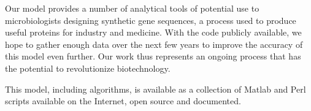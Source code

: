 \documentclass[12pt]{article}
\numberwithin{equation}{section}
\begin{document}
Our model provides a number of analytical tools of potential use to 
microbiologists designing synthetic gene sequences, a process used to
produce useful proteins for industry and medicine.
With the code publicly available, we hope to gather enough data over the
next few years to improve the accuracy of this model even further.
Our work thus represents an ongoing process that has the potential
to revolutionize biotechnology.

This model, including algorithms, is available as a collection of
Matlab and Perl scripts available on the Internet, open source and documented.

{}
\begin{singlespace}
  
\end{singlespace}
\end{document}
